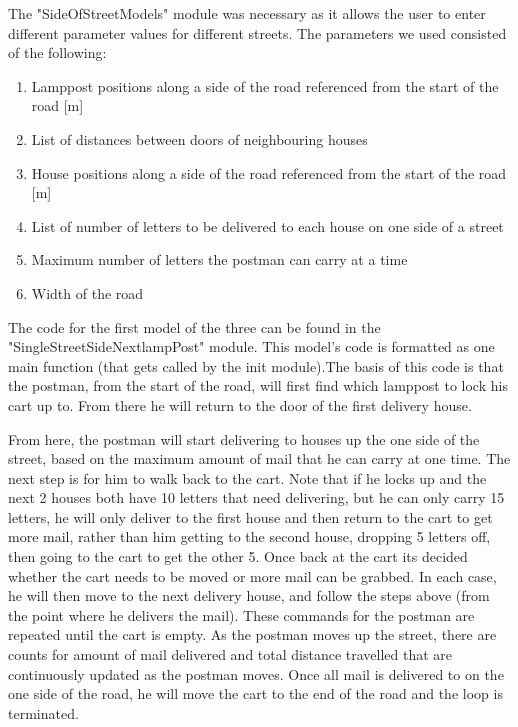 \documentclass[14pt]{article}
\begin{document}
The "SideOfStreetModels" module was necessary as it allows the user to enter different parameter values for different streets. The parameters we used consisted of the following:
\begin{enumerate}
    \item Lamppost positions along a side of the road referenced from the start of the road [m]
    \item List of distances between doors of neighbouring houses
    \item House positions along a side of the road referenced from the start of the road [m]
    \item List of number of letters to be delivered to each house on one side of a street
    \item Maximum number of letters the postman can carry at a time
    \item Width of the road
\end{enumerate}

The code for the first model of the three can be found in the "SingleStreetSideNextlampPost" module. This model's code is formatted as one main function (that gets called by the init module).The basis of this code is that the postman, from the start of the road, will first find which lamppost to lock his cart up to. From there he will return to the door of the first delivery house. 

From here, the postman will start delivering to houses up the one side of the street, based on the maximum amount of mail that he can carry at one time. The next step is for him to walk back to the cart. Note that if he locks up and the next 2 houses both have 10 letters that need delivering, but he can only carry 15 letters, he will only deliver to the first house and then return to the cart to get more mail, rather than him getting to the second house, dropping 5 letters off, then going to the cart to get the other 5. Once back at the cart its decided whether the cart needs to be moved or  more mail can be grabbed. In each case, he will then move to the next delivery house, and follow the steps above (from the point where he delivers the mail). These commands for the postman are repeated until the cart is empty. As the postman moves up the street, there are counts for amount of mail delivered and total distance travelled that are continuously updated as the postman moves. Once all mail is delivered to on the one side of the road, he will move the cart to the end of the road and the loop is terminated. 
\end{document}

